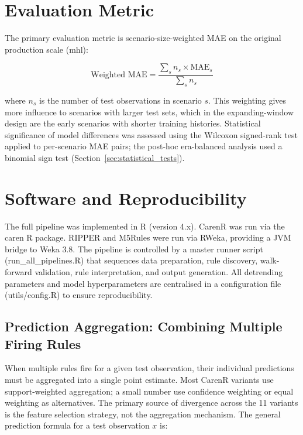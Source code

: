 \section{Evaluation Metric}\label{sec:evaluation_metric}

The primary evaluation metric is scenario-size-weighted MAE on the original production scale (mhl):

\begin{equation}
  \text{Weighted MAE} = \frac{\sum_{s} n_s \times \text{MAE}_s}{\sum_{s} n_s}
  \label{eq:wmae}
\end{equation}

where $n_s$ is the number of test observations in scenario $s$. This weighting gives more influence to scenarios with larger test sets, which in the expanding-window design are the early scenarios with shorter training histories. Statistical significance of model differences was assessed using the Wilcoxon signed-rank test applied to per-scenario MAE pairs; the post-hoc era-balanced analysis used a binomial sign test (Section~\ref{sec:statistical_tests}).


\section{Software and Reproducibility}\label{sec:software_and_reproducibility}

The full pipeline was implemented in R (version 4.x). CarenR was run via the caren R package. RIPPER and M5Rules were run via RWeka, providing a JVM bridge to Weka 3.8. The pipeline is controlled by a master runner script (run\_all\_pipelines.R) that sequences data preparation, rule discovery, walk-forward validation, rule interpretation, and output generation. All detrending parameters and model hyperparameters are centralised in a configuration file (utils/config.R) to ensure reproducibility.




\subsection{Prediction Aggregation: Combining Multiple Firing Rules}\label{sub:prediction_aggregation_combining_multiple}

When multiple rules fire for a given test observation, their individual predictions must be aggregated into a single point estimate. Most CarenR variants use support-weighted aggregation; a small number use confidence weighting or equal weighting as alternatives. The primary source of divergence across the 11 variants is the feature selection strategy, not the aggregation mechanism. The general prediction formula for a test observation $x$ is:

